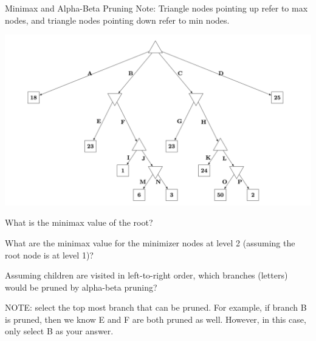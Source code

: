 \begin{problem}{Minimax and Alpha-Beta Pruning}
Note: Triangle nodes pointing up refer to max nodes, and triangle nodes pointing down refer to min nodes.

\begin{center}
\includegraphics[width=400 pt]{figures/Minimax-and-AlphaBeta-q6.png}
\end{center}

\begin{question}[1]
What is the minimax value of the root?

\end{question}

\begin{question}[2]
What are the minimax value for the minimizer nodes at level 2 (assuming the root node is at level 1)?
\begin{subquestion}[1]

\end{subquestion}
\qquad
\begin{subquestion}[1]

\end{subquestion}
\end{question}

\begin{question}[4]
Assuming children are visited in left-to-right order, which branches (letters)  would be pruned by alpha-beta pruning?

NOTE: select the top most branch that can be pruned. For example, if branch B is pruned, then we know E and F are both pruned as well. However, in this case, only select B as your answer.



\end{question}
\end{problem}
